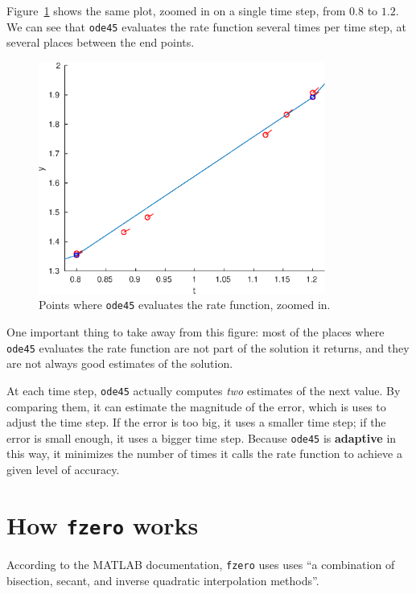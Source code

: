 \documentclass[
]{book}
\numberwithin{Answer}{chapter}
\numberwithin{Exercise}{chapter}
\begin{document}
Figure~\ref{fig:odeplot2} shows the same plot, zoomed in on a single time step, from $0.8$ to $1.2$.  We can see that {\tt ode45} evaluates the rate function several times per time step, at several places between the end points.  

\begin{figure}
\centerline{\includegraphics[height=3in]{book/figs/odeplot2.eps}}
\caption{Points where {\tt ode45} evaluates the rate function, zoomed in.}
\label{fig:odeplot2}
\end{figure}

One important thing to take away from this figure: most of the places where {\tt ode45} evaluates the rate function are not part of the solution it returns, and they are not always good estimates of the solution.

At each time step, {\tt ode45} actually computes {\em two} estimates of the next value.  By comparing them, it can estimate the magnitude of the error, which is uses to adjust the time step.  If the error is too big, it uses a smaller time step; if the error is small enough, it uses a bigger time step.  Because {\tt ode45} is {\bf adaptive} in this way, it minimizes the number of times it calls the rate function to achieve a given level of accuracy.



\section{How {\tt fzero} works}
\label{sect:howfzero}

According to the MATLAB documentation, {\tt fzero} uses uses ``a combination of bisection, secant, and inverse quadratic interpolation methods''.

\end{document}
